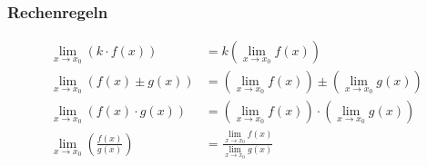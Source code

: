 \subsubsection{Rechenregeln}
\begin{align*}
\lim_{x\to x_0}{(k \cdot f(x))}& = k (\lim_{x\to x_0}{f(x)})\\
\lim_{x\to x_0}{(f(x) \pm g(x))}& = (\lim_{x\to x_0}{f(x)}) \pm (\lim_{x\to x_0}{g(x)})\\
\lim_{x\to x_0}{(f(x) \cdot g(x))}& = (\lim_{x\to x_0}{f(x)}) \cdot (\lim_{x\to x_0}{g(x)})\\
\lim_{x\to x_0}{(\frac{f(x)}{g(x)})}& = \frac{\lim_{x\to x_0}f(x)}{\lim_{x\to x_0}g(x)}\\
\end{align*}

